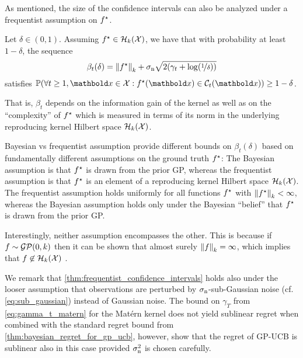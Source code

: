 As mentioned, the size of the confidence intervals can also be analyzed under a frequentist assumption on $f^\star$.

\begin{thm}\label{thm:frequentist_confidence_intervals}
  Let $\delta \in (0,1)$.
  Assuming $f^\star \in \mathcal{H}_k(\mathcal{X})$, we have that with probability at least $1 - \delta$, the sequence \begin{align}
    \beta_t(\delta) = \norm{\opt{f}}_k + \sigman \sqrt{2 \parentheses*{\gamma_t + \log\parentheses*{\nicefrac{1}{\delta}}}}
  \end{align} satisfies $\Pr{\forall t \geq 1, \vx \in \spX : \opt{f}(\vx) \in \spC_t(\vx)} \geq 1 - \delta$.
\end{thm}

That is, $\beta_t$ depends on the information gain of the kernel as well as on the ``complexity'' of $f^\star$ which is measured in terms of its norm in the underlying reproducing kernel Hilbert space $\mathcal{H}_k(\mathcal{X})$.

\begin{rmk}{Bayesian vs frequentist assumption}{}
   provide different bounds on $\beta_t(\delta)$ based on fundamentally different assumptions on the ground truth $f^\star$:
  The Bayesian assumption is that $f^\star$ is drawn from the prior GP, whereas the frequentist assumption is that $f^\star$ is an element of a reproducing kernel Hilbert space $\mathcal{H}_k(\mathcal{X})$.
  The frequentist assumption holds uniformly for all functions $f^\star$ with $\norm{\opt{f}}_k < \infty$, whereas the Bayesian assumption holds only under the Bayesian ``belief'' that $f^\star$ is drawn from the prior GP.

  Interestingly, neither assumption encompasses the other.
  This is because if $f \sim \GP{0}{k}$ then it can be shown that almost surely $\norm{f}_k = \infty$, which implies that $f \not\in \mathcal{H}_k(\mathcal{X})$ \citep{srinivas2009gaussian}.
\end{rmk}

We remark that \cref{thm:frequentist_confidence_intervals} holds also under the looser assumption that observations are perturbed by $\sigma_{\mathrm{n}}$-sub-Gaussian noise (cf. \cref{eq:sub_gaussian}) instead of Gaussian noise.
The bound on $\gamma_T$ from \cref{eq:gamma_t_matern} for the Matérn kernel does not yield sublinear regret when combined with the standard regret bound from \cref{thm:bayesian_regret_for_gp_ucb}, however, \cite{whitehouse2023sublinear} show that the regret of GP-UCB is sublinear also in this case provided $\sigma_{\mathrm{n}}^2$ is chosen carefully.

